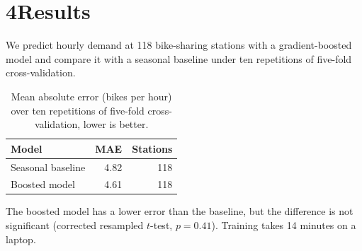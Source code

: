 \documentclass[11pt]{article}
\begin{document}
\section*{4\quad Results}
We predict hourly demand at 118 bike-sharing stations with a gradient-boosted
model and compare it with a seasonal baseline under ten repetitions of
five-fold cross-validation.

\begin{table}[h]
\centering
\caption{Mean absolute error (bikes per hour) over ten repetitions of
five-fold cross-validation, lower is better.}
\begin{tabular}{@{}lrr@{}}
\toprule
Model & MAE & Stations \\
\midrule
Seasonal baseline & 4.82 & 118 \\
Boosted model     & 4.61 & 118 \\
\bottomrule
\end{tabular}
\end{table}

The boosted model has a lower error than the baseline, but the difference is
not significant (corrected resampled $t$-test, $p = 0.41$).
Training takes 14 minutes on a laptop.
\end{document}
